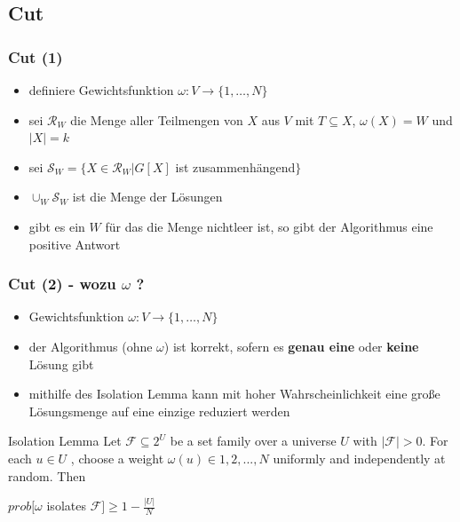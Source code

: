 \documentclass{beamer}
\begin{document}
\subsection{Cut}
\begin{frame}
\frametitle{Cut (1)}
\begin{itemize}
\item definiere Gewichtsfunktion $\omega:V\rightarrow \{1,\dots,N\}$ 
\item sei $\mathcal{R}_W$ die Menge aller Teilmengen von $X$ aus $V$ mit $T \subseteq X$, $\omega(X)=W$ und $|X|=k$
\item sei  $\mathcal{S}_W=\{X \in \mathcal{R}_W | G[X]$ ist zusammenhängend$\}$ 
\item $\cup_W \mathcal{S}_W$ ist die Menge der Lösungen
\item gibt es ein $W$ für das die Menge nichtleer ist, so gibt der Algorithmus eine positive Antwort
\end{itemize}
\end{frame}
\begin{frame}
\frametitle{Cut (2) - wozu $\omega$ ?}
\begin{itemize}
\item Gewichtsfunktion $\omega:V\rightarrow \{1,\dots,N\}$ 
\item der Algorithmus (ohne $\omega$) ist korrekt, sofern es \textbf{genau eine} oder \textbf{keine} Lösung gibt
\item mithilfe des Isolation Lemma kann mit hoher Wahrscheinlichkeit eine große Lösungsmenge auf eine einzige reduziert werden
\end{itemize}
\begin{block}{Isolation Lemma}
Let $\mathcal{F} \subseteq 2^U$ be a set family over a universe $U$ with $|\mathcal{F}| > 0$. For each $u \in U$ ,
choose a weight $\omega(u) \in {1, 2, . . . , N }$ uniformly and independently at random. Then
\begin{center}
$prob[\omega$ isolates $\mathcal{F}]\geq 1 - \frac{|U|}{N}$
\end{center}
\end{block}
\end{frame}
\end{document}
